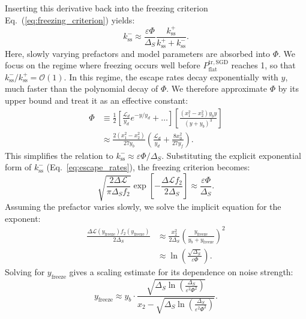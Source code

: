 \documentclass[aps,prx,reprint,superscriptaddress,longbibliography,nofootinbib,floatfix]{revtex4-2}
\begin{document}
Inserting this derivative back into the freezing criterion Eq.~(\ref{eq:freezing_criterion}) yields:
\begin{equation}
     k_\mathrm{ss}^{-} \approx \frac{\varepsilon \Phi}{\Delta_S} \frac{k_\mathrm{ss}^{+}}{k_\mathrm{ss}^{+} + k_\mathrm{ss}^{-}}.
\end{equation}
Here, slowly varying prefactors and model parameters are absorbed into $\Phi$. We focus on the regime where freezing occurs well before 
$P_{\mathrm{flat}}^{\mathrm{tr,SGD}}$ reaches 1, so that 
$k_\mathrm{ss}^{-}/k_\mathrm{ss}^{+}=\mathcal{O}(1)$. 
In this regime, the escape rates decay exponentially with $y$, 
much faster than the polynomial decay of $\Phi$. 
We therefore approximate $\Phi$ by its upper bound and treat it as an effective constant:
\begin{equation}
\begin{split}
    \Phi &\equiv \frac{1}{2}\left[ \frac{\mathcal{L}_d}{y_d} e^{-y/y_d} +\dots \right] \left[ \frac{(x_1^2-x_2^2)y_b y}{(y+y_b)^3} \right] \\
    &\approx \frac{2(x_1^2-x_2^2)}{27 y_b}\left(\frac{\mathcal{L}_d}{y_d}+\frac{8x_0^2}{27 y_f}\right).
\end{split}
\end{equation}
This simplifies the relation to ${k_\mathrm{ss}^{-}} \approx \varepsilon \Phi / \Delta_S$. Substituting the explicit exponential form of $k_\mathrm{ss}^{-}$ (Eq.~\ref{eq:escape_rates}), the freezing criterion becomes:
\begin{equation}
    \sqrt{\frac{2 \Delta \mathcal{L}}{\pi \Delta_S f_2}} \exp\left[- \frac{\Delta \mathcal{L} f_2}{2\Delta_S} \right] \approx \frac{\varepsilon \Phi}{\Delta_S}.
\end{equation}
Assuming the prefactor varies slowly, we solve the implicit equation for the exponent:
\begin{equation}
\begin{split}
    \frac{\Delta \mathcal{L}(y_\mathrm{freeze}) f_2(y_\mathrm{freeze})}{2\Delta_S} 
    &\approx \frac{x_2^2}{2\Delta_S} \left(\frac{y_\mathrm{freeze}}{y_b+y_\mathrm{freeze}}\right)^2 \\
    &\approx \ln\left( \frac{\sqrt{\Delta_S}}{\varepsilon \Phi} \right).
\end{split}
\end{equation}
Solving for $y_\mathrm{freeze}$ gives a scaling estimate for its dependence on noise strength:
\begin{equation}
y_\mathrm{freeze} \approx y_b \cdot \frac{\sqrt{\Delta_S \ln\left( \frac{\Delta_S}{\varepsilon^2 \Phi^2} \right)}}{x_2 - \sqrt{\Delta_S \ln\left( \frac{\Delta_S}{\varepsilon^2 \Phi^2} \right)}}.
\label{eq:y_freeze_explicit}
\end{equation}
\end{document}
